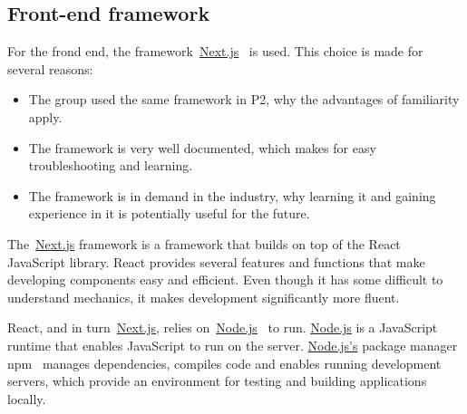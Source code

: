 \subsection{Front-end framework}\label{subsec:front-end-framework}

For the frond end, the framework~\url{Next.js}~\cite{next2024} is used.
This choice is made for several reasons:

\begin{itemize}
    \item The group used the same framework in P2, why the advantages of familiarity apply.
    \item The framework is very well documented, which makes for easy troubleshooting and learning.
    \item The framework is in demand in the industry, why learning it and gaining experience in it is potentially useful
    for the future.
\end{itemize}

The~\url{Next.js} framework is a framework that builds on top of the React~\cite{react2024} JavaScript library.
React provides several features and functions that make developing components easy and efficient.
Even though it has some difficult to understand mechanics, it makes development significantly more fluent.

React, and in turn~\url{Next.js}, relies on~\url{Node.js}~\cite{node2024} to run.
\url{Node.js} is a JavaScript runtime that enables JavaScript to run on the server.
\url{Node.js's} package manager npm~\cite{npm2024} manages dependencies, compiles code and enables running
development servers, which provide an environment for testing and building applications locally.
